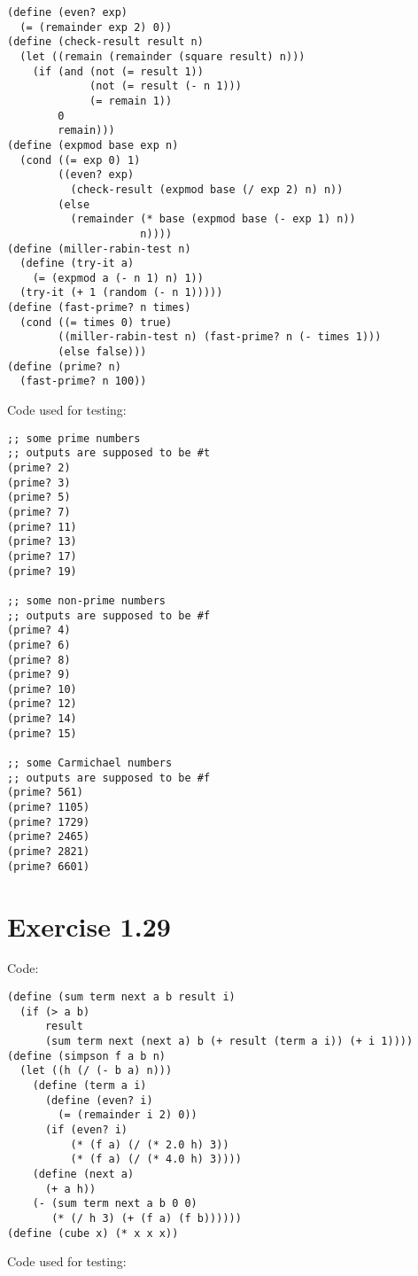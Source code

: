 \documentclass[../main.tex]{subfiles}
\begin{document}
\begin{lstlisting}
(define (even? exp)
  (= (remainder exp 2) 0))
(define (check-result result n)
  (let ((remain (remainder (square result) n)))
    (if (and (not (= result 1))
             (not (= result (- n 1)))
             (= remain 1))
        0
        remain)))
(define (expmod base exp n)
  (cond ((= exp 0) 1)
        ((even? exp)
          (check-result (expmod base (/ exp 2) n) n))
        (else
          (remainder (* base (expmod base (- exp 1) n))
                     n))))
(define (miller-rabin-test n)
  (define (try-it a)
    (= (expmod a (- n 1) n) 1))
  (try-it (+ 1 (random (- n 1)))))
(define (fast-prime? n times)
  (cond ((= times 0) true)
        ((miller-rabin-test n) (fast-prime? n (- times 1)))
        (else false)))
(define (prime? n)
  (fast-prime? n 100))
\end{lstlisting}

Code used for testing:

\begin{lstlisting}
;; some prime numbers
;; outputs are supposed to be #t
(prime? 2)
(prime? 3)
(prime? 5)
(prime? 7)
(prime? 11)
(prime? 13)
(prime? 17)
(prime? 19)

;; some non-prime numbers
;; outputs are supposed to be #f
(prime? 4)
(prime? 6)
(prime? 8)
(prime? 9)
(prime? 10)
(prime? 12)
(prime? 14)
(prime? 15)

;; some Carmichael numbers
;; outputs are supposed to be #f
(prime? 561)
(prime? 1105)
(prime? 1729)
(prime? 2465)
(prime? 2821)
(prime? 6601)
\end{lstlisting}

\section{Exercise 1.29}

Code:

\begin{lstlisting}
(define (sum term next a b result i)
  (if (> a b)
      result
      (sum term next (next a) b (+ result (term a i)) (+ i 1))))
(define (simpson f a b n)
  (let ((h (/ (- b a) n)))
    (define (term a i)
      (define (even? i)
        (= (remainder i 2) 0))
      (if (even? i)
          (* (f a) (/ (* 2.0 h) 3))
          (* (f a) (/ (* 4.0 h) 3))))
    (define (next a)
      (+ a h))
    (- (sum term next a b 0 0)
       (* (/ h 3) (+ (f a) (f b))))))
(define (cube x) (* x x x))
\end{lstlisting}

Code used for testing:
\end{document}

